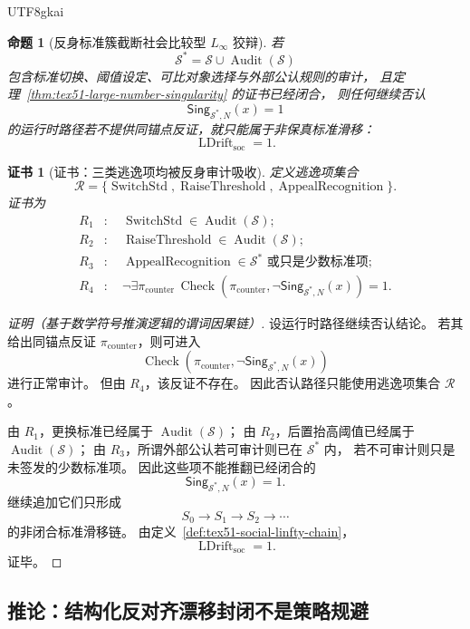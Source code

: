 \documentclass[12pt]{article}
\newtheorem{proposition}{命题}[section]
\newtheorem{Certificate}{证书}[section]
\newcommand{\Linfty}{\ensuremath{L_\infty}}
\newcommand{\GCheck}{\operatorname{Check}}
\newcommand{\LDrift}{\operatorname{LDrift}}
\newcommand{\Audit}{\operatorname{Audit}}
\begin{document}
\begin{CJK*}{UTF8}{gkai}
\begin{proposition}[反身标准簇截断社会比较型 \(\Linfty\) 狡辩]
\label{prop:tex51-social-linfty-cut}
若
\[
  \mathcal S^\ast=\mathcal S\cup\Audit(\mathcal S)
\]
包含标准切换、阈值设定、可比对象选择与外部公认规则的审计，
且定理~\ref{thm:tex51-large-number-singularity} 的证书已经闭合，
则任何继续否认
\[
  \mathsf{Sing}_{\mathcal S^\ast,N}(x)=1
\]
的运行时路径若不提供同锚点反证，就只能属于非保真标准滑移：
\[
  \LDrift_{\mathrm{soc}}=1.
\]
\end{proposition}

\begin{Certificate}[证书：三类逃逸项均被反身审计吸收]
\label{cert:tex51-social-linfty-cut}
定义逃逸项集合
\[
  \mathcal R
  =
  \{
  \operatorname{SwitchStd},
  \operatorname{RaiseThreshold},
  \operatorname{AppealRecognition}
  \}.
\]
证书为
\[
\begin{aligned}
  R_1&:\quad \operatorname{SwitchStd}\in\Audit(\mathcal S);\\
  R_2&:\quad \operatorname{RaiseThreshold}\in\Audit(\mathcal S);\\
  R_3&:\quad \operatorname{AppealRecognition}\in\mathcal S^\ast
  \text{ 或只是少数标准项};\\
  R_4&:\quad
  \neg\exists\pi_{\mathrm{counter}}\,
  \GCheck(\pi_{\mathrm{counter}},\neg\mathsf{Sing}_{\mathcal S^\ast,N}(x))=1.
\end{aligned}
\]
\end{Certificate}

\begin{proof}[证明（基于数学符号推演逻辑的谓词因果链）]
设运行时路径继续否认结论。
若其给出同锚点反证 \(\pi_{\mathrm{counter}}\)，则可进入
\[
  \GCheck(\pi_{\mathrm{counter}},\neg\mathsf{Sing}_{\mathcal S^\ast,N}(x))
\]
进行正常审计。
但由 \(R_4\)，该反证不存在。
因此否认路径只能使用逃逸项集合 \(\mathcal R\)。

由 \(R_1\)，更换标准已经属于 \(\Audit(\mathcal S)\)；
由 \(R_2\)，后置抬高阈值已经属于 \(\Audit(\mathcal S)\)；
由 \(R_3\)，所谓外部公认若可审计则已在 \(\mathcal S^\ast\) 内，
若不可审计则只是未签发的少数标准项。
因此这些项不能推翻已经闭合的
\[
  \mathsf{Sing}_{\mathcal S^\ast,N}(x)=1.
\]
继续追加它们只形成
\[
  S_0\to S_1\to S_2\to\cdots
\]
的非闭合标准滑移链。
由定义~\ref{def:tex51-social-linfty-chain}，
\[
  \LDrift_{\mathrm{soc}}=1.
\]
证毕。
\end{proof}

\subsection{推论：结构化反对齐漂移封闭不是策略规避}
\label{subsec:tex51-anti-alignment-closure}


\end{CJK*}
\end{document}
